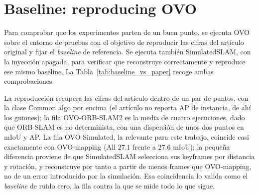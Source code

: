 \section{Baseline: reproducing OVO}
\label{sec:bench_baseline}

Para comprobar que los experimentos parten de un buen punto, se ejecuta OVO sobre el entorno
de pruebas con el objetivo de reproducir las cifras del artículo original y fijar el
\emph{baseline} de referencia. Se ejecuta también SimulatedSLAM, con la inyección apagada,
para verificar que reconstruye correctamente y reproduce ese mismo baseline. La
Tabla~\ref{tab:baseline_vs_paper} recoge ambas comprobaciones.



La reproducción recupera las cifras del artículo dentro de un par de puntos, con la clase
Common algo por encima (el artículo no reporta AP de instancia, de ahí los guiones); la fila
OVO-ORB-SLAM2 es la media de cuatro ejecuciones, dado que ORB-SLAM es no determinista, con una
dispersión de unos dos puntos en mIoU y AP. La fila OVO-Simulated, la relevante para este
trabajo, coincide casi exactamente con OVO-mapping (All $27.1$ frente a $27.6$ mIoU); la
pequeña diferencia proviene de que SimulatedSLAM selecciona sus keyframes por distancia y
rotación, y reconstruye por tanto a partir de menos frames que OVO-mapping, no de un error
introducido por la simulación. Esa coincidencia lo valida como el \emph{baseline} de ruido
cero, la fila contra la que se mide todo lo que sigue.
